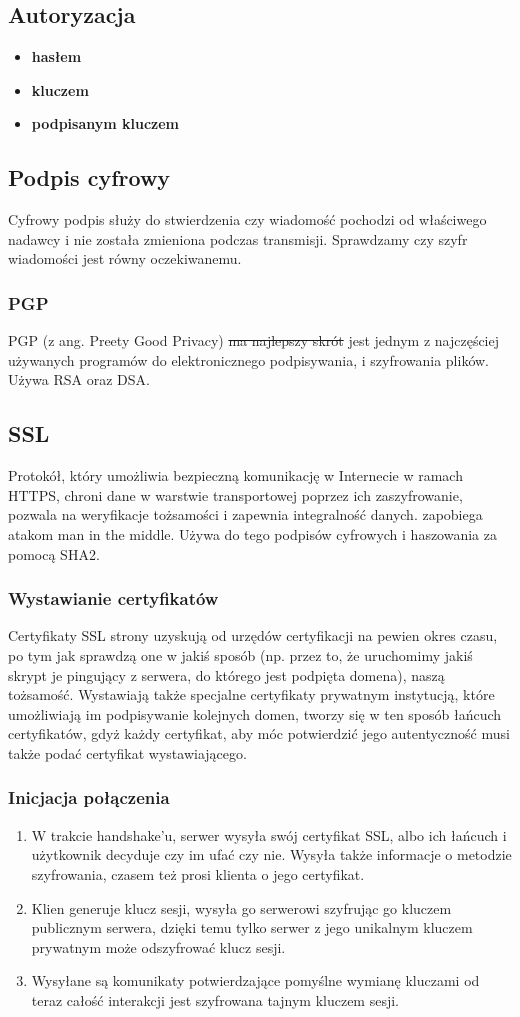 \documentclass[]{article}
\begin{document}
\subsection{Autoryzacja}
\begin{itemize}
    \item \textbf{hasłem}
    \item \textbf{kluczem}
    \item \textbf{podpisanym kluczem}
\end{itemize}
\subsection{Podpis cyfrowy}
Cyfrowy podpis służy do stwierdzenia czy wiadomość pochodzi od właściwego nadawcy i nie została zmieniona podczas transmisji. Sprawdzamy czy szyfr wiadomości jest równy oczekiwanemu.
\subsubsection{PGP}
PGP (z ang. Preety Good Privacy) \sout{ma najlepszy skrót} jest jednym z najczęściej używanych programów do elektronicznego podpisywania, i szyfrowania plików. Używa RSA oraz DSA.
\subsection{SSL}
Protokół, który umożliwia bezpieczną komunikację w Internecie w ramach HTTPS, chroni dane w warstwie transportowej poprzez ich zaszyfrowanie, pozwala na weryfikacje tożsamości i zapewnia integralność danych. zapobiega atakom man in the middle. Używa do tego podpisów cyfrowych i haszowania za pomocą SHA2.
\subsubsection{Wystawianie certyfikatów}
Certyfikaty SSL strony uzyskują od urzędów certyfikacji na pewien okres czasu, po tym jak sprawdzą one w jakiś sposób (np. przez to, że uruchomimy jakiś skrypt je pingujący z serwera, do którego jest podpięta domena), naszą tożsamość. Wystawiają także specjalne certyfikaty prywatnym instytucją, które umożliwiają im podpisywanie kolejnych domen, tworzy się w ten sposób łańcuch certyfikatów, gdyż każdy certyfikat, aby móc potwierdzić jego autentyczność musi także podać certyfikat wystawiającego.
\subsubsection{Inicjacja połączenia}
\begin{enumerate}
    \item W trakcie handshake'u, serwer wysyła swój certyfikat SSL, albo ich łańcuch i użytkownik decyduje czy im ufać czy nie. Wysyła także informacje o metodzie szyfrowania, czasem też prosi klienta o jego certyfikat.
    \item Klien generuje klucz sesji, wysyła go serwerowi szyfrując go kluczem publicznym serwera, dzięki temu tylko serwer z jego unikalnym kluczem prywatnym może odszyfrować klucz sesji.
    \item Wysyłane są komunikaty potwierdzające pomyślne wymianę kluczami od teraz całość interakcji jest szyfrowana tajnym kluczem sesji.
\end{enumerate}
\end{document}
